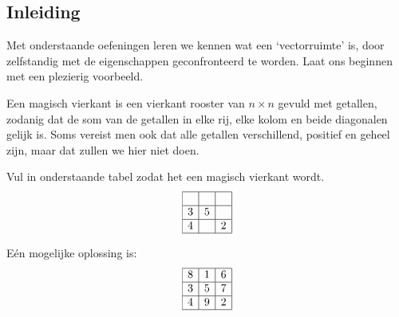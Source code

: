 \documentclass{ximera}
\begin{document}
\author{Alexander Holvoet}

\subsection*{Inleiding}
Met onderstaande oefeningen leren we kennen wat een `vectorruimte' is, door zelfstandig met de eigenschappen geconfronteerd te worden.
Laat ons beginnen met een plezierig voorbeeld.\newline

Een magisch vierkant is een vierkant rooster van \(n \times n\) gevuld met getallen, zodanig dat de som van de getallen in elke rij, elke kolom en beide diagonalen gelijk is.
Soms vereist men ook dat alle getallen verschillend, positief en geheel zijn, maar dat zullen we hier niet doen.

\begin{exercise}
    Vul in onderstaande tabel zodat het een magisch vierkant wordt.
    \[
    \begin{array}{|c|c|c|}
    \hline
     &  &  \\
    \hline
    3 & 5 &  \\
    \hline
    4 &  & 2 \\
    \hline
    \end{array}
    \]
    \begin{oplossing}
        Eén mogelijke oplossing is:
        \[
        \begin{array}{|c|c|c|}
        \hline
        8 & 1 & 6 \\
        \hline
        3 & 5 & 7 \\
        \hline
        4 & 9 & 2 \\
        \hline
        \end{array}
        \]
    \end{oplossing}
\end{exercise}
\end{document}
